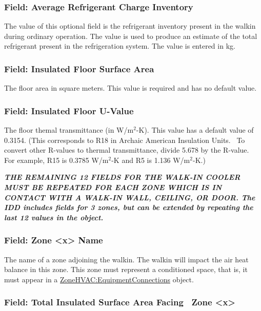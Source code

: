 \subsubsection{Field: Average Refrigerant Charge Inventory}\label{field-average-refrigerant-charge-inventory-1}

The value of this optional field is the refrigerant inventory present in the walkin during ordinary operation. The value is used to produce an estimate of the total refrigerant present in the refrigeration system. The value is entered in kg.

\subsubsection{Field: Insulated Floor Surface Area}\label{field-insulated-floor-surface-area}

The floor area in square meters. This value is required and has no default value.

\subsubsection{Field: Insulated Floor U-Value}\label{field-insulated-floor-u-value}

The floor themal transmittance (in W/m\(^{2}\)-K). This value has a default value of 0.3154. (This corresponds to R18 in Archaic American Insulation Units.~ To convert other R-values to thermal transmittance, divide 5.678 by the R-value.~ For example, R15 is 0.3785 W/m\(^{2}\)-K and R5 is 1.136 W/m\(^{2}\)-K.)

\textbf{\emph{THE REMAINING 12 FIELDS FOR THE WALK-IN COOLER MUST BE REPEATED FOR EACH ZONE WHICH IS IN CONTACT WITH A WALK-IN WALL, CEILING, OR DOOR. The IDD includes fields for 3 zones, but can be extended by repeating the last 12 values in the object.}}

\subsubsection{Field: Zone \textless{}x\textgreater{} Name}\label{field-zone-x-name}

The name of a zone adjoining the walkin. The walkin will impact the air heat balance in this zone. This zone must represent a conditioned space, that is, it must appear in a \hyperref[zonehvacequipmentconnections]{ZoneHVAC:EquipmentConnections} object.

\subsubsection{Field: Total Insulated Surface Area Facing~ Zone \textless{}x\textgreater{}}\label{field-total-insulated-surface-area-facing-zone-x}

